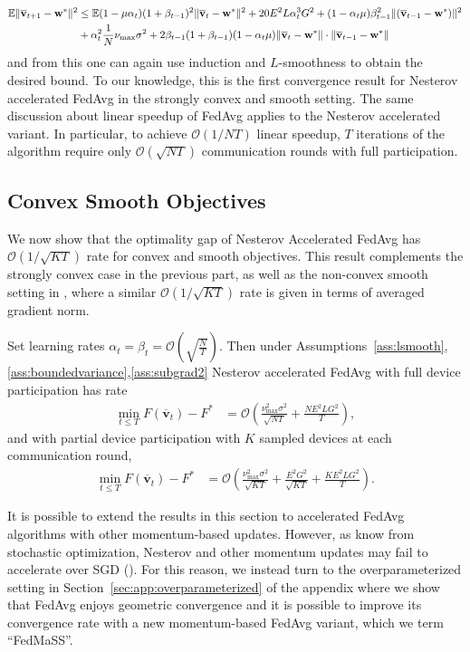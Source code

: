 \begin{align*}
\mathbb{E}\|{\overline{\mathbf{v}}}_{t+1}-{\mathbf{w}}^{\ast}\|^{2} & \leq\mathbb{E}(1-\mu\alpha_{t})(1+\beta_{t-1})^{2}\|{\overline{\mathbf{v}}}_{t}-{\mathbf{w}}^{\ast}\|^{2}+20E^{2}L\alpha_{t}^{3}G^{2}+(1-\alpha_{t}\mu)\beta_{t-1}^{2}\|({\overline{\mathbf{v}}}_{t-1}-{\mathbf{w}}^{\ast})\|^{2}\\
& +\alpha_{t}^{2}\frac{1}{N}\nu_{\max}\sigma^{2}+2\beta_{t-1}(1+\beta_{t-1})(1-\alpha_{t}\mu)\|{\overline{\mathbf{v}}}_{t}-{\mathbf{w}}^{\ast}\|\cdot\|{\overline{\mathbf{v}}}_{t-1}-{\mathbf{w}}^{\ast}\|
\end{align*}
and from this one can again use induction and $L$-smoothness to obtain the desired bound.
%
To our knowledge, this is the first convergence result for Nesterov
accelerated FedAvg in the strongly convex and smooth setting. The
same discussion about linear speedup of FedAvg applies to the Nesterov
accelerated variant. In particular, to achieve $\mathcal{O}(1/NT)$
linear speedup, $T$ iterations of the algorithm require only $\mathcal{O}(\sqrt{NT})$
communication rounds with full participation. 


\subsection{Convex Smooth Objectives}

We now show that the optimality gap of Nesterov Accelerated FedAvg has $\mathcal{O}(1/\sqrt{KT})$ rate for convex and smooth objectives. This result complements the strongly convex case in the previous
part, as well as the non-convex smooth setting in \cite{huo2020faster,yu2019linear,li2018federated},
where a similar $\mathcal{O}(1/\sqrt{KT})$ rate is given in terms
of averaged gradient norm. 
\begin{theorem}
	\label{thm:Nesterov_cvx}Set learning rates $\alpha_{t}=\beta_{t}=\mathcal{O}(\sqrt{\frac{N}{T}})$. Then under Assumptions~\ref{ass:lsmooth},\ref{ass:boundedvariance},\ref{ass:subgrad2} Nesterov accelerated FedAvg with
	full device participation has rate
	\begin{align*}
	\min_{t\leq T}F(\overline{\mathbf{v}}_{t})-F^{\ast} & =\mathcal{O}\left(\frac{\nu_{\max}^{2}\sigma^{2}}{\sqrt{NT}}+\frac{NE^{2}LG^{2}}{T}\right),
	\end{align*}
	and with partial device participation with $K$ sampled devices at
	each communication round, 
	\begin{align*}
	\min_{t\leq T}F(\overline{\mathbf{v}}_{t})-F^{\ast} & =\mathcal{O}\left(\frac{\nu_{\max}^{2}\sigma^{2}}{\sqrt{KT}}+\frac{E^{2}G^{2}}{\sqrt{KT}}+\frac{KE^{2}LG^{2}}{T}\right).
	\end{align*}
\end{theorem}
%
	It is possible to extend the results in this section to accelerated
    FedAvg algorithms with other momentum-based updates. However, as know from stochastic optimization, Nesterov and other momentum
updates may fail to accelerate over SGD (\cite{liu2018accelerating,kidambi2018insufficiency,liu2018toward,yuan2016influence}).
    For this reason, we instead turn to the overparameterized setting
    \cite{ma2017power,liu2018accelerating,canziani2016analysis} in Section~\ref{sec:app:overparameterized} of the appendix where we show that FedAvg enjoys geometric convergence
    and it is possible to improve its convergence rate with a new momentum-based FedAvg variant, which we term ``FedMaSS''.